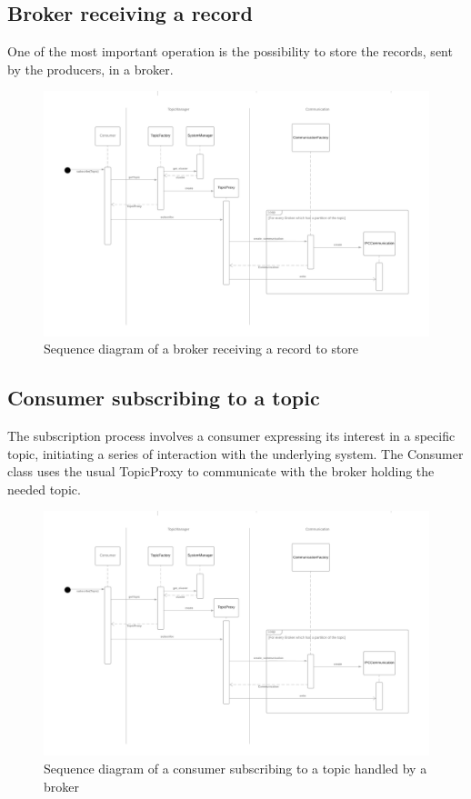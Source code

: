 \subsection{Broker receiving a record}

One of the most important operation is the possibility to store the records,
sent by the producers, in a broker. 

\begin{figure}[H]
    \centering
    \includegraphics[width=1.0\textwidth]{Figures/sequence_diagram_broker.png}
    \caption{Sequence diagram of a broker receiving a record to store}
\end{figure}

\subsection{Consumer subscribing to a topic}

The subscription process involves a consumer expressing its interest in a
specific topic, initiating a series of interaction with the underlying system.
The Consumer class uses the usual TopicProxy to communicate with the broker
holding the needed topic.

\begin{figure}[H]
    \centering
    \includegraphics[width=1.0\textwidth]{Figures/sequence_diagram_subscription.png}
    \caption{Sequence diagram of a consumer subscribing to a topic handled by
             a broker}
\end{figure}


